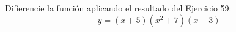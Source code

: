 \setcounter{enumi}{59}
\item Difierencie la función aplicando el resultado del Ejercicio 59:
$$y = (x + 5)(x^2 + 7)(x - 3)$$
